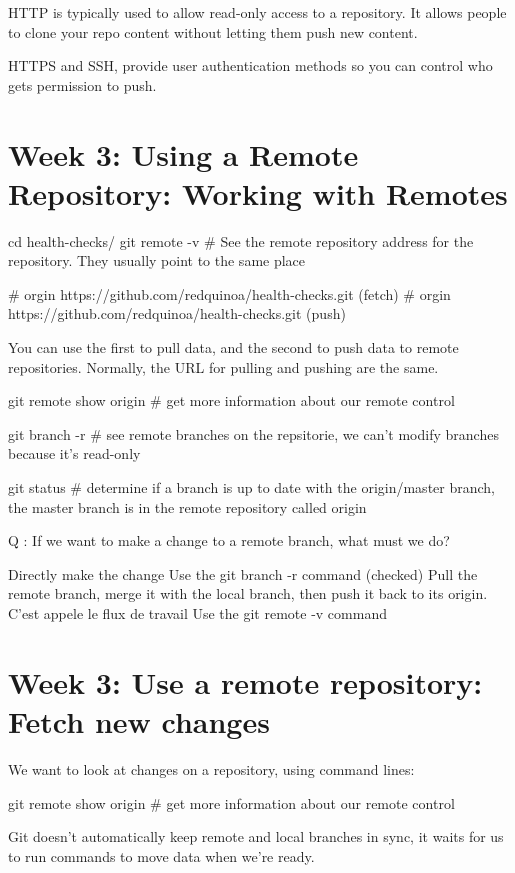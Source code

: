 \documentclass[11pt, onecolumn]{article}
\begin{document}
HTTP is typically used to allow read-only access to a repository. It allows people to clone your repo content without letting them push new content.

HTTPS and SSH, provide user authentication methods so you can control who gets permission to push.



\section{Week 3: Using a Remote Repository: Working with Remotes}

cd health-checks/
git remote -v    # See the remote repository address for the repository. They usually point to the same place

# orgin https://github.com/redquinoa/health-checks.git (fetch)
# orgin https://github.com/redquinoa/health-checks.git (push)

You can use the first to pull data, and the second to push data to remote repositories. Normally, the URL for pulling and pushing are the same.

git remote show origin    # get more information about our remote control

git branch -r       # see remote branches on the repsitorie, we can't modify branches because it's read-only

git status   # determine if a branch is up to date with the origin/master branch, the master branch is in the remote repository called origin


Q : If we want to make a change to a remote branch, what must we do?

Directly make the change
Use the git branch -r command
(checked) Pull the remote branch, merge it with the local branch, then push it back to its origin. C'est appele le flux de travail
Use the git remote -v command


\section{Week 3: Use a remote repository: Fetch new changes}

We want to look at changes on a repository, using command lines:

git remote show origin   # get more information about our remote control

Git doesn't automatically keep remote and local branches in sync, it waits for us to run commands to move data when we're ready.
\end{document}
